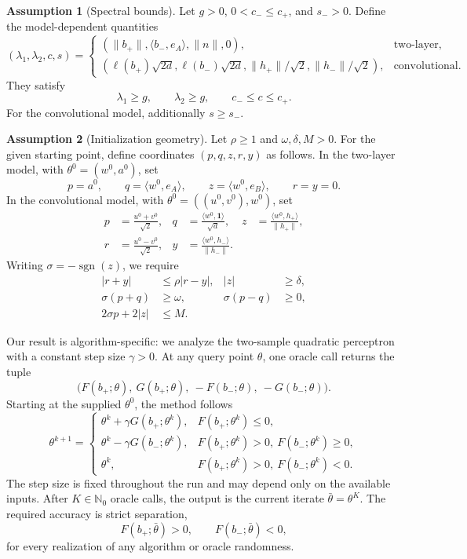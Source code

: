 \documentclass[10pt]{article}
\theoremstyle{definition}
\newtheorem{assumption}{Assumption}
\begin{document}
\begin{assumption}[Spectral bounds]
Let $g>0$, $0<c_-\leq c_+$, and $s_->0$. Define the model-dependent quantities
\[
(\lambda_1,\lambda_2,c,s)=
\begin{cases}
(\|b_+\|,\langle b_-,e_A\rangle,\|n\|,0),
&\text{two-layer},\\
(\ell(b_+)\sqrt{2d},\ell(b_-)\sqrt{2d},
\|h_+\|/\sqrt{2},\|h_-\|/\sqrt{2}),
&\text{convolutional}.
\end{cases}
\]
They satisfy
\[
\lambda_1\geq g,\qquad \lambda_2\geq g,\qquad
c_-\leq c\leq c_+.
\]
For the convolutional model, additionally $s\geq s_-$.
\end{assumption}

\begin{assumption}[Initialization geometry]
Let $\rho\geq1$ and $\omega,\delta,M>0$.
For the given starting point, define coordinates $(p,q,z,r,y)$ as follows. In the two-layer model, with $\theta^0=(w^0,a^0)$, set
\[
p=a^0,\qquad q=\langle w^0,e_A\rangle,\qquad
z=\langle w^0,e_B\rangle,\qquad r=y=0.
\]
In the convolutional model, with $\theta^0=((u^0,v^0),w^0)$, set
\[
\begin{aligned}
p&=\frac{u^0+v^0}{\sqrt{2}},&
q&=\frac{\langle w^0,\mathbf{1}\rangle}{\sqrt d},&
z&=\frac{\langle w^0,h_+\rangle}{\|h_+\|},\\
r&=\frac{u^0-v^0}{\sqrt{2}},&
y&=\frac{\langle w^0,h_-\rangle}{\|h_-\|}.
\end{aligned}
\]
Writing $\sigma=-\operatorname{sgn}(z)$, we require
\[
\begin{aligned}
|r+y|&\leq\rho|r-y|,& |z|&\geq\delta,\\
\sigma(p+q)&\geq\omega,& \sigma(p-q)&\geq0,\\
2\sigma p+2|z|&\leq M.
\end{aligned}
\]
\end{assumption}

Our result is algorithm-specific: we analyze the two-sample quadratic perceptron with a constant step size $\gamma>0$. At any query point $\theta$, one oracle call returns the tuple
\[
\bigl(F(b_+;\theta),\ G(b_+;\theta),\
-F(b_-;\theta),\ -G(b_-;\theta)\bigr).
\]
Starting at the supplied $\theta^0$, the method follows
\[
\theta^{k+1}=
\begin{cases}
\theta^k+\gamma G(b_+;\theta^k),
& F(b_+;\theta^k)\leq0,\\
\theta^k-\gamma G(b_-;\theta^k),
& F(b_+;\theta^k)>0,\ F(b_-;\theta^k)\geq0,\\
\theta^k,
& F(b_+;\theta^k)>0,\ F(b_-;\theta^k)<0.
\end{cases}
\]
The step size is fixed throughout the run and may depend only on the available inputs. After $K\in\mathbb{N}_0$ oracle calls, the output is the current iterate $\bar{\theta}=\theta^K$. The required accuracy is strict separation,
\[
F(b_+;\bar{\theta})>0,
\qquad
F(b_-;\bar{\theta})<0,
\]
for every realization of any algorithm or oracle randomness.
\end{document}
